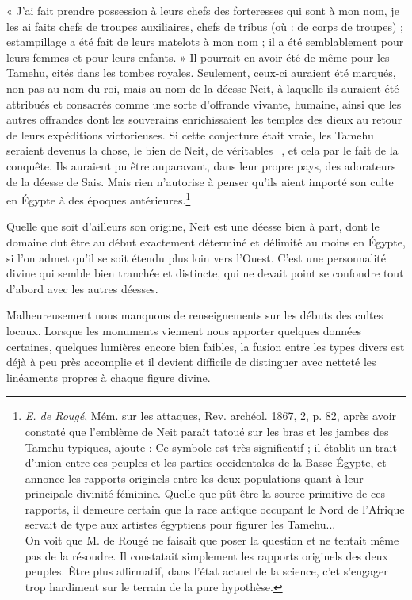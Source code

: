 \documentclass[a4paper, 11pt, oneside]{article}
\newcommand*\hieroAADS{}
\newcommand*\hieroAAEF{}
\newcommand*\hieroAAEK{}
\begin{document}
« J'ai fait prendre possession à leurs chefs des forteresses qui sont à mon nom, je les ai faits chefs de troupes auxiliaires, chefs de tribus (où : de corps de troupes) ; estampillage a été fait de leurs matelots à mon nom ; il a été semblablement pour leurs femmes et pour leurs enfants. »
Il pourrait en avoir été de même pour les Tamehu, cités dans les tombes royales. Seulement, ceux-ci auraient été marqués, non pas au nom du roi, mais au nom de la déesse Neit, à laquelle ils auraient été attribués et consacrés comme une sorte d'offrande vivante, humaine, ainsi que les autres offrandes dont les souverains enrichissaient les temples des dieux au retour de leurs expéditions victorieuses. Si cette conjecture était vraie, les Tamehu seraient devenus la chose, le bien de Neit, de véritables $\hieroAAEK\:\hieroAADS\:\hieroAAEF$, et cela par le fait de la conquête. Ils auraient pu être auparavant, dans leur propre pays, des adorateurs de la déesse de Sais. Mais rien n'autorise à penser qu'ils aient importé son culte en Égypte à des époques antérieures.\footnote{\emph{E. de Rougé}, Mém. sur les attaques, Rev. archéol. 1867, 2, p. 82, après avoir constaté que l'emblème de Neit paraît tatoué sur les bras et les jambes des Tamehu typiques, ajoute : Ce symbole est très significatif ; il établit un trait d'union entre ces peuples et les parties occidentales de la Basse-Égypte, et annonce les rapports originels entre les deux populations quant à leur principale divinité féminine. Quelle que pût être la source primitive de ces rapports, il demeure certain que la race antique occupant le Nord de l'Afrique servait de type aux artistes égyptiens pour figurer les Tamehu...\\\hspace*{5mm}On voit que M. de Rougé ne faisait que poser la question et ne tentait même pas de la résoudre. Il constatait simplement les rapports originels des deux peuples. Être plus affirmatif, dans l'état actuel de la science, c'et s'engager trop hardiment sur le terrain de la pure hypothèse.}

Quelle que soit d'ailleurs son origine, Neit est une déesse bien à part, dont le domaine dut être au début exactement déterminé et délimité au moins en Égypte, si l'on admet qu'il se soit étendu plus loin vers l'Ouest. C'est une personnalité divine qui semble bien tranchée et distincte, qui ne devait point se confondre tout d'abord avec les autres déesses.

Malheureusement nous manquons de renseignements sur les débuts des cultes locaux. Lorsque les monuments viennent nous apporter quelques données certaines, quelques lumières encore bien faibles, la fusion entre les types divers est déjà à peu près accomplie et il devient difficile de distinguer avec netteté les linéaments propres à chaque figure divine.
\end{document}

